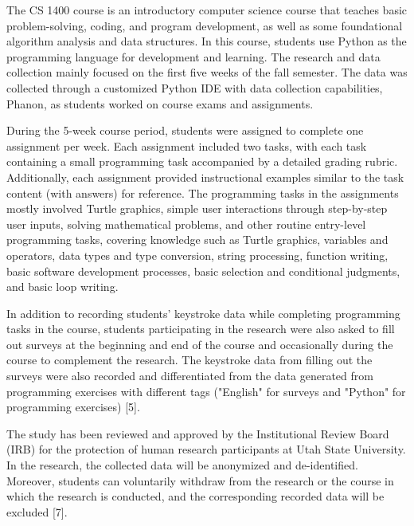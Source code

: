 \documentclass[sigconf,final]{acmart}
\begin{document}
The CS 1400 course is an introductory computer science course that teaches basic problem-solving, coding, and program development, as well as some foundational algorithm analysis and data structures. In this course, students use Python as the programming language for development and learning. The research and data collection mainly focused on the first five weeks of the fall semester. The data was collected through a customized Python IDE with data collection capabilities, Phanon, as students worked on course exams and assignments. 

During the 5-week course period, students were assigned to complete one assignment per week. Each assignment included two tasks, with each task containing a small programming task accompanied by a detailed grading rubric. Additionally, each assignment provided instructional examples similar to the task content (with answers) for reference. The programming tasks in the assignments mostly involved Turtle graphics, simple user interactions through step-by-step user inputs, solving mathematical problems, and other routine entry-level programming tasks, covering knowledge such as Turtle graphics, variables and operators, data types and type conversion, string processing, function writing, basic software development processes, basic selection and conditional judgments, and basic loop writing.

In addition to recording students' keystroke data while completing programming tasks in the course, students participating in the research were also asked to fill out surveys at the beginning and end of the course and occasionally during the course to complement the research. The keystroke data from filling out the surveys were also recorded and differentiated from the data generated from programming exercises with different tags ("English" for surveys and "Python" for programming exercises) [5].

The study has been reviewed and approved by the Institutional Review Board (IRB) for the protection of human research participants at Utah State University. In the research, the collected data will be anonymized and de-identified. Moreover, students can voluntarily withdraw from the research or the course in which the research is conducted, and the corresponding recorded data will be excluded [7].
\end{document}
